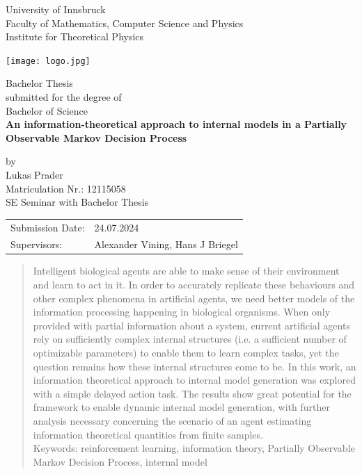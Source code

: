 \documentclass[12pt,a4paper]{article}
\begin{document}
\def\findate{24.07.2024}


\thispagestyle{empty}
\begin{center}
    \Large{University of Innsbruck \\ Faculty of Mathematics, Computer Science and Physics} \\
    \vspace{3mm}
    \large{Institute for Theoretical Physics}
    \vspace{10mm}

    \texttt{[image: logo.jpg]}

    \vspace{10mm}
    \Large{Bachelor Thesis} \\
    \large{submitted for the degree of} \\
    \Large{Bachelor of Science} \\
    \vspace{10mm}
    \LARGE{\textbf{An information-theoretical approach to internal models in a Partially Observable Markov Decision Process}} \\
    \vspace{10mm}

    \large{by \\ Lukas Prader \\ Matriculation Nr.: 12115058 \\ SE Seminar with Bachelor Thesis}
\end{center}

\vspace{30mm}
\begin{tabular}{ll}
    \large{Submission Date:} & \large{\findate}                          \\
    \large{Supervisors:}     & \large{Alexander Vining, Hans J  Briegel} \\
\end{tabular}


\newpage
\thispagestyle{empty}
\begin{abstract}
    \noindent Intelligent biological agents are able to make sense of their environment and learn to act in it.
    In order to accurately replicate these behaviours and other complex phenomena in artificial agents, we need better models of the information processing happening in biological organisms.
    When only provided with partial information about a system, current artificial agents rely on sufficiently complex internal structures (i.e. a sufficient number of optimizable parameters) to enable them to learn complex tasks, yet the question remains how these internal structures come to be.
    In this work, an information theoretical approach to internal model generation was explored with a simple delayed action task.
    The results show great potential for the framework to enable dynamic internal model generation, with further analysis necessary concerning the scenario of an agent estimating information theoretical quantities from finite samples.\\

    \noindent Keywords: reinforcement learning, information theory, Partially Observable Markov Decision Process, internal model
\end{abstract}
\end{document}
